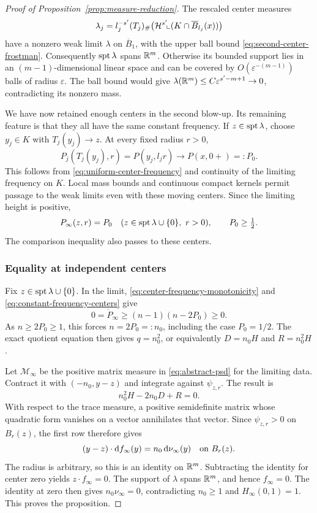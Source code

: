 \begin{proof}[Proof of Proposition~\ref{prop:measure-reduction}]
The rescaled center measures
\[
 \lambda_j=l_j^{-s'}(T_j)_\#
       \big(\mathcal H^{s'}\!\llcorner(K\cap\overline B_{l_j}(x))\big)
\]
have a nonzero weak limit $\lambda$ on $\overline B_1$, with the
upper ball bound \eqref{eq:second-center-frostman}. Consequently
$\operatorname{spt}\lambda$ spans $\mathbb R^m$. Otherwise its bounded support lies in
an $(m-1)$-dimensional linear space and can be covered by
$O(\varepsilon^{-(m-1)})$ balls of radius $\varepsilon$. The ball
bound would give
$\lambda(\mathbb R^m)\le C\varepsilon^{s'-m+1}\to0$, contradicting
its nonzero mass.

We have now retained enough centers in the second blow-up. Its
remaining feature is that they all have the same constant frequency.
If $z\in\operatorname{spt}\lambda$, choose $y_j\in K$ with
$T_j(y_j)\to z$. At every fixed radius $r>0$,
\[
 P_j(T_j(y_j),r)=P(y_j,l_jr)
       \longrightarrow P(x,0+)=:P_0.
\]
This follows from \eqref{eq:uniform-center-frequency} and continuity
of the limiting frequency on $K$. Local mass bounds and continuous
compact kernels permit passage to the weak limits even with these
moving centers. Since the limiting height is positive,
\begin{equation}
 \label{eq:constant-frequency-centers}
 P_\infty(z,r)=P_0
 \quad(z\in\operatorname{spt}\lambda\cup\{0\},\ r>0),
 \qquad P_0\ge\tfrac12.
\end{equation}
The comparison inequality also passes to these centers.

\subsubsection*{Equality at independent centers}

Fix $z\in\operatorname{spt}\lambda\cup\{0\}$. In the limit,
\eqref{eq:center-frequency-monotonicity} and
\eqref{eq:constant-frequency-centers} give
\[
 0=\dot P_\infty\ge(n-1)(n-2P_0)\ge0.
\]
As $n\ge2P_0\ge1$, this forces $n=2P_0=:n_0$, including the
case $P_0=1/2$. The exact quotient equation then gives
$q=n_0^2$, or equivalently $D=n_0H$ and $R=n_0^2H$.

Let $\mathcal M_\infty$ be the positive matrix measure in
\eqref{eq:abstract-psd} for the limiting data. Contract it with
$(-n_0,y-z)$ and integrate against $\psi_{z,r}$. The result is
\[
 n_0^2H-2n_0D+R=0.
\]
With respect to the trace measure, a positive semidefinite matrix
whose quadratic form vanishes on a vector annihilates that vector.
Since $\psi_{z,r}>0$ on $B_r(z)$, the first row therefore gives
\[
 (y-z)\cdot\mathrm d f_\infty(y)=n_0\,\mathrm d\nu_\infty(y)
 \quad\hbox{on }B_r(z).
\]
The radius is arbitrary, so this is an identity on $\mathbb R^m$.
Subtracting the identity for center zero yields
$z\cdot f_\infty=0$. The support of $\lambda$ spans $\mathbb R^m$,
and hence $f_\infty=0$. The identity at zero then gives
$n_0\nu_\infty=0$, contradicting $n_0\ge1$ and
$H_\infty(0,1)=1$. This proves the proposition.
\end{proof}

